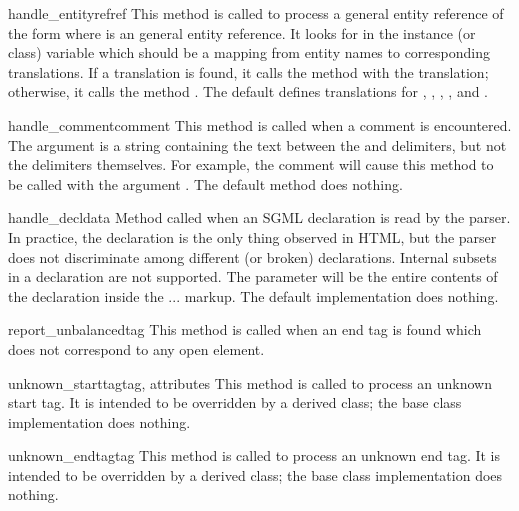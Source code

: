 \begin{methoddesc}{handle_entityref}{ref}
This method is called to process a general entity reference of the
form  where  is an general entity
reference.  It looks for  in the instance (or class)
variable  which should be a mapping from entity
names to corresponding translations.  If a translation is found, it
calls the method  with the translation;
otherwise, it calls the method .
The default  defines translations for
, , , , and
.
\end{methoddesc}

\begin{methoddesc}{handle_comment}{comment}
This method is called when a comment is encountered.  The
 argument is a string containing the text between the
\samp{<!--} and \samp{-->} delimiters, but not the delimiters
themselves.  For example, the comment  will
cause this method to be called with the argument .  The
default method does nothing.
\end{methoddesc}

\begin{methoddesc}{handle_decl}{data}
Method called when an SGML declaration is read by the parser.  In
practice, the  declaration is the only thing observed in
HTML, but the parser does not discriminate among different (or broken)
declarations.  Internal subsets in a  declaration are
not supported.  The  parameter will be the entire contents
of the declaration inside the \code{<!}...\code{>} markup.  The
default implementation does nothing.
\end{methoddesc}

\begin{methoddesc}{report_unbalanced}{tag}
This method is called when an end tag is found which does not
correspond to any open element.
\end{methoddesc}

\begin{methoddesc}{unknown_starttag}{tag, attributes}
This method is called to process an unknown start tag.  It is intended
to be overridden by a derived class; the base class implementation
does nothing.
\end{methoddesc}

\begin{methoddesc}{unknown_endtag}{tag}
This method is called to process an unknown end tag.  It is intended
to be overridden by a derived class; the base class implementation
does nothing.
\end{methoddesc}

